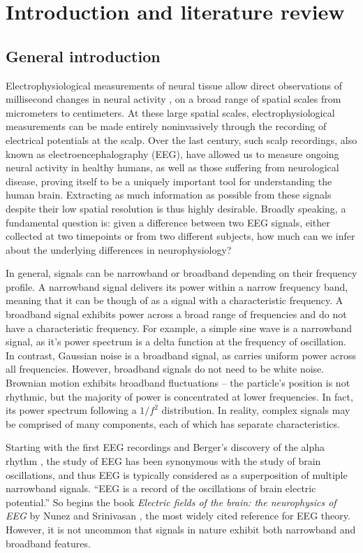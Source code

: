 \chapter{Introduction and literature review} \label{sec:intro}


\section{General introduction}

Electrophysiological measurements of neural tissue allow direct observations of millisecond changes in neural activity \cite{Donoghue2020}, on a broad range of spatial scales from micrometers to centimeters. At these large spatial scales, electrophysiological measurements can be made entirely noninvasively through the recording of electrical potentials at the scalp. Over the last century, such scalp recordings, also known as electroencephalography (EEG), have allowed us to measure ongoing neural activity in healthy humans, as well as those suffering from neurological disease, proving itself to be a uniquely important tool for understanding the human brain. Extracting as much information as possible from these signals despite their low spatial resolution is thus highly desirable. Broadly speaking, a fundamental question is: given a difference between two EEG signals, either collected at two timepoints or from two different subjects, how much can we infer about the underlying differences in neurophysiology? 

In general, signals can be narrowband or broadband depending on their frequency profile. A narrowband signal delivers its power within a narrow frequency band, meaning that it can be though of as a signal with a characteristic frequency. A broadband signal exhibits power across a broad range of frequencies and do not have a characteristic frequency. For example, a simple sine wave is a narrowband signal, as it's power spectrum is a delta function at the frequency of oscillation. In contrast, Gaussian noise is a broadband signal, as carries uniform power across all frequencies. However, broadband signals do not need to be white noise. Brownian motion exhibits broadband fluctuations -- the particle's position is not rhythmic, but the majority of power is concentrated at lower frequencies. In fact, its power spectrum following a $1/f^2$ distribution. In reality, complex signals may be comprised of many components, each of which has separate characteristics. 

Starting with the first EEG recordings and Berger’s discovery of the alpha rhythm \cite{Berger1929}, the study of EEG has been synonymous with the study of brain oscillations, and thus EEG is typically considered as a superposition of multiple narrowband signals. ``EEG is a record of the oscillations of brain electric potential.'' So begins the book \textit{Electric fields of the brain: the neurophysics of EEG} by Nunez and Srinivasan \cite{Nunez2006}, the most widely cited reference for EEG theory. However, it is not uncommon that signals in nature exhibit both narrowband and broadband features. 

